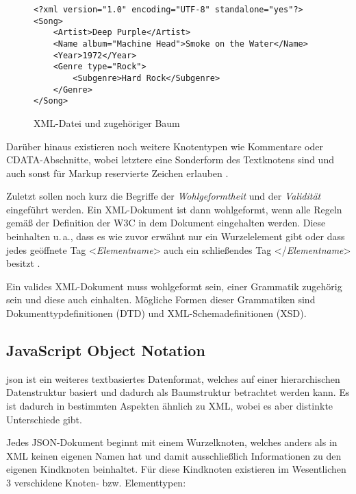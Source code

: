 \begin{figure}[!htb]
    \centering

\begin{verbatim}
<?xml version="1.0" encoding="UTF-8" standalone="yes"?>
<Song>
	<Artist>Deep Purple</Artist>
	<Name album="Machine Head">Smoke on the Water</Name>
	<Year>1972</Year>
	<Genre type="Rock">
		<Subgenre>Hard Rock</Subgenre>
	</Genre>
</Song>
\end{verbatim}

  
  \label{fig:xml_tree_intro}

\caption{XML-Datei und zugehöriger Baum}
\label{fig:xml_intro}
\end{figure}

Darüber hinaus existieren noch weitere Knotentypen wie Kommentare oder CDATA-Abschnitte, wobei letztere eine Sonderform des Textknotens sind und auch sonst für Markup reservierte Zeichen erlauben \autocite[Abs. 2.7]{xmlSpec}. 

Zuletzt sollen noch kurz die Begriffe der \textit{Wohlgeformtheit} und der \textit{Validität} eingeführt werden. Ein XML-Dokument ist dann wohlgeformt, wenn alle Regeln gemäß der Definition der W3C in dem Dokument eingehalten werden. Diese beinhalten u.\,a., dass es wie zuvor erwähnt nur ein Wurzelelement gibt oder dass jedes geöffnete Tag <\textit{Elementname}> auch ein schließendes Tag </\textit{Elementname}> besitzt \autocite[Abs. 2.1]{xmlSpec}.

Ein valides XML-Dokument muss wohlgeformt sein, einer Grammatik zugehörig sein und diese auch einhalten. Mögliche Formen dieser Grammatiken sind Dokumenttypdefinitionen (DTD) und XML-Schemadefinitionen (XSD)\autocite[Abs 2.8]{xmlSpec}\autocite[Abs 2.1]{xsdSpec}. 

\subsection{JavaScript Object Notation}

\acrfull{json} ist ein weiteres textbasiertes Datenformat, welches auf einer hierarchischen Datenstruktur basiert und dadurch als Baumstruktur betrachtet werden kann. Es ist dadurch in bestimmten Aspekten ähnlich zu XML, wobei es aber distinkte Unterschiede gibt. 

Jedes JSON-Dokument beginnt mit einem Wurzelknoten, welches anders als in XML keinen eigenen Namen hat und damit ausschließlich Informationen zu den eigenen Kindknoten beinhaltet. Für diese Kindknoten existieren im Wesentlichen 3 verschidene Knoten- bzw. Elementtypen:

